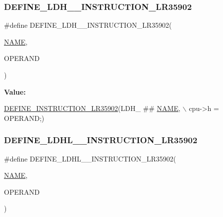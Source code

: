 \subsubsection{\texorpdfstring{D\+E\+F\+I\+N\+E\+\_\+\+L\+D\+H\+\_\+\+\_\+\+I\+N\+S\+T\+R\+U\+C\+T\+I\+O\+N\+\_\+\+L\+R35902}{DEFINE\_LDH\_\_INSTRUCTION\_LR35902}}
{\footnotesize\ttfamily \#define D\+E\+F\+I\+N\+E\+\_\+\+L\+D\+H\+\_\+\+\_\+\+I\+N\+S\+T\+R\+U\+C\+T\+I\+O\+N\+\_\+\+L\+R35902(\begin{DoxyParamCaption}\item[{}]{\mbox{\hyperlink{inflate_8h_a164ea0159d5f0b5f12a646f25f99eceaa67bc2ced260a8e43805d2480a785d312}{N\+A\+ME}},  }\item[{}]{O\+P\+E\+R\+A\+ND }\end{DoxyParamCaption})}

{\bfseries Value\+:}
\begin{DoxyCode}
\mbox{\hyperlink{isa-lr35902_8c_a3128fc43c5d01e8b51f67901c0b4b5ef}{DEFINE\_INSTRUCTION\_LR35902}}(LDH\_ ## \mbox{\hyperlink{inflate_8h_a164ea0159d5f0b5f12a646f25f99eceaa67bc2ced260a8e43805d2480a785d312}{NAME}}, \(\backslash\)
        cpu->h = OPERAND;)
\end{DoxyCode}
\mbox{\label{isa-lr35902_8c_a018d9ec0cb59ba9a11d9e389f8479e0c}} 
\subsubsection{\texorpdfstring{D\+E\+F\+I\+N\+E\+\_\+\+L\+D\+H\+L\+\_\+\+\_\+\+I\+N\+S\+T\+R\+U\+C\+T\+I\+O\+N\+\_\+\+L\+R35902}{DEFINE\_LDHL\_\_INSTRUCTION\_LR35902}}
{\footnotesize\ttfamily \#define D\+E\+F\+I\+N\+E\+\_\+\+L\+D\+H\+L\+\_\+\+\_\+\+I\+N\+S\+T\+R\+U\+C\+T\+I\+O\+N\+\_\+\+L\+R35902(\begin{DoxyParamCaption}\item[{}]{\mbox{\hyperlink{inflate_8h_a164ea0159d5f0b5f12a646f25f99eceaa67bc2ced260a8e43805d2480a785d312}{N\+A\+ME}},  }\item[{}]{O\+P\+E\+R\+A\+ND }\end{DoxyParamCaption})}

